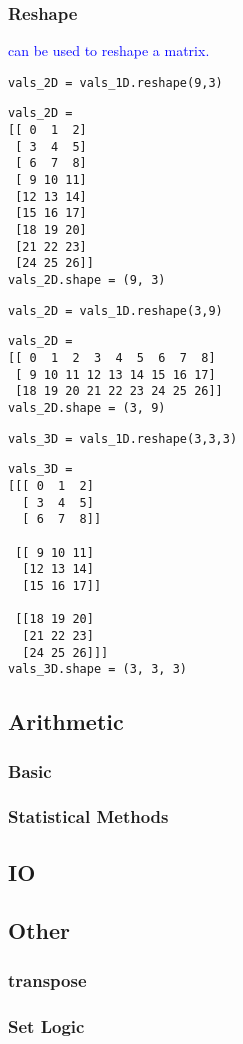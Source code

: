\subsubsection{Reshape}

\textcolor{blue}{ can be used to reshape a matrix.}

\begin{lstlisting}[style=pyInStyle]
vals_2D = vals_1D.reshape(9,3)
\end{lstlisting}
\begin{lstlisting}[style=pyOutStyle]
vals_2D = 
[[ 0  1  2]
 [ 3  4  5]
 [ 6  7  8]
 [ 9 10 11]
 [12 13 14]
 [15 16 17]
 [18 19 20]
 [21 22 23]
 [24 25 26]]
vals_2D.shape = (9, 3)
\end{lstlisting}


\begin{lstlisting}[style=pyInStyle]
vals_2D = vals_1D.reshape(3,9)
\end{lstlisting}
\begin{lstlisting}[style=pyOutStyle]
vals_2D = 
[[ 0  1  2  3  4  5  6  7  8]
 [ 9 10 11 12 13 14 15 16 17]
 [18 19 20 21 22 23 24 25 26]]
vals_2D.shape = (3, 9)
\end{lstlisting}


\begin{lstlisting}[style=pyInStyle]
vals_3D = vals_1D.reshape(3,3,3)
\end{lstlisting}
\begin{lstlisting}[style=pyOutStyle]
vals_3D = 
[[[ 0  1  2]
  [ 3  4  5]
  [ 6  7  8]]

 [[ 9 10 11]
  [12 13 14]
  [15 16 17]]

 [[18 19 20]
  [21 22 23]
  [24 25 26]]]
vals_3D.shape = (3, 3, 3)
\end{lstlisting}


\subsection{Arithmetic}

\subsubsection{Basic}

\subsubsection{Statistical Methods}

\subsection{IO}



\subsection{Other}

\subsubsection{transpose}

\subsubsection{Set Logic}



